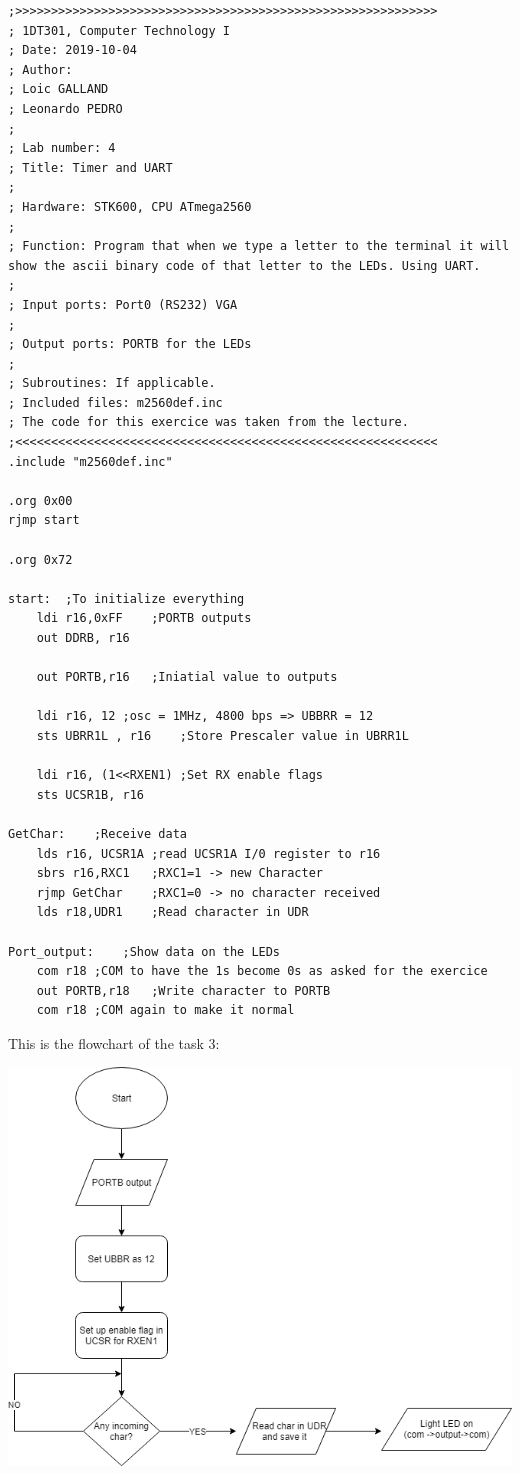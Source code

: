 \documentclass[a4paper,12pt]{article}
\begin{document}
\lstset{style=Asm}
\begin{lstlisting}
;>>>>>>>>>>>>>>>>>>>>>>>>>>>>>>>>>>>>>>>>>>>>>>>>>>>>>>>>>>>
; 1DT301, Computer Technology I
; Date: 2019-10-04
; Author:
; Loic GALLAND
; Leonardo PEDRO
;
; Lab number: 4
; Title: Timer and UART
;
; Hardware: STK600, CPU ATmega2560
;
; Function: Program that when we type a letter to the terminal it will show the ascii binary code of that letter to the LEDs. Using UART.
; 
; Input ports: Port0 (RS232) VGA 
;
; Output ports: PORTB for the LEDs 
;
; Subroutines: If applicable.
; Included files: m2560def.inc
; The code for this exercice was taken from the lecture.
;<<<<<<<<<<<<<<<<<<<<<<<<<<<<<<<<<<<<<<<<<<<<<<<<<<<<<<<<<<<
.include "m2560def.inc"

.org 0x00
rjmp start

.org 0x72

start:	;To initialize everything
	ldi r16,0xFF	;PORTB outputs
	out DDRB, r16
	
	out PORTB,r16	;Iniatial value to outputs

	ldi r16, 12	;osc = 1MHz, 4800 bps => UBBRR = 12
	sts UBRR1L , r16	;Store Prescaler value in UBRR1L

	ldi r16, (1<<RXEN1)	;Set RX enable flags 
	sts UCSR1B, r16

GetChar:	;Receive data
	lds r16, UCSR1A	;read UCSR1A I/0 register to r16
	sbrs r16,RXC1	;RXC1=1 -> new Character
	rjmp GetChar	;RXC1=0 -> no character received
	lds r18,UDR1	;Read character in UDR

Port_output:	;Show data on the LEDs
	com r18	;COM to have the 1s become 0s as asked for the exercice
	out PORTB,r18	;Write character to PORTB 
	com r18	;COM again to make it normal 
\end{lstlisting}

This is the flowchart of the task 3:
\begin{center}
\includegraphics[scale=0.7]{img/TASK3.png}
\end{center}
\newpage
\end{document}
